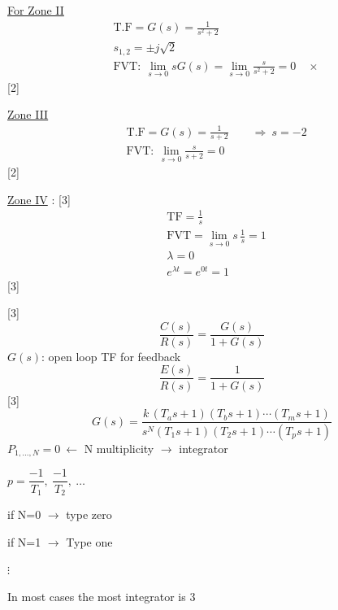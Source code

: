 \documentclass[11pt,a4paper]{article}
\begin{document}
\underline{For Zone II}
\begin{align*}
&\text{T.F}=G(s)=\frac{1}{s^{2}+2}\\
&s_{1,2}=\pm j\sqrt{2}\\
&\text{FVT}:\ \lim_{s\to0}sG(s)=\lim_{s\to0}\frac{s}{s^{2}+2}=0\quad\times
\end{align*}
[2]

\underline{Zone III}
\begin{align*}
&\text{T.F}=G(s)=\frac{1}{s+2}\qquad\Rightarrow\ s=-2\\
&\text{FVT}:\ \lim_{s\to0}\frac{s}{s+2}=0
\end{align*}
[2]

\underline{Zone IV} :
[3]
\begin{align*}
&\text{TF}=\frac{1}{s}\\
&\text{FVT}=\lim_{s\to0}s\,\frac{1}{s}=1\\
&\lambda=0\\
&e^{\lambda t}=e^{0t}=1
\end{align*}
[3]

[3]
\[ \frac{C(s)}{R(s)}=\frac{G(s)}{1+G(s)} \]
$G(s)$: open loop TF for  feedback
\[ \frac{E(s)}{R(s)}=\frac{1}{1+G(s)} \]
[3]
\[ G(s)=\frac{k\,(T_as+1)(T_bs+1)\cdots(T_ms+1)}{s^{N}(T_1s+1)(T_2s+1)\cdots(T_ps+1)} \]
$P_{1,\ldots,N}=0\ \leftarrow$ N multiplicity $\rightarrow$ integrator

$p=\dfrac{-1}{T_1},\ \dfrac{-1}{T_2},\ \ldots$

if N=0 $\rightarrow$ type zero

if N=1 $\rightarrow$ Type one

$\vdots$

In most cases the most integrator is 3

\end{document}
